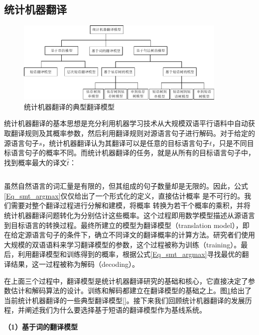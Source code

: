 \subsection{统计机器翻译}

\begin{figure}[!htbp]
	\centering
	\includegraphics[width=0.9\textwidth]{Figure/Figure_2_2.pdf}
	\caption{统计机器翻译的典型翻译模型}
	\label{Fig_smt_model}
\end{figure}

统计机器翻译的基本思想是充分利用机器学习技术从大规模双语平行语料中自动获取翻译规则及其概率参数，然后利用翻译规则对源语言句子进行解码。对于给定的源语言句子$s$，统计机器翻译认为其翻译可以是任意的目标语言句子$t$，只是不同目标语言句子的概率不同。而统计机器翻译的任务，就是从所有的目标语言句子中，找到概率最大的译文$\widehat{t}$：

\begin{equation}
\label{Eq_smt_argmax}
\end{equation}

虽然自然语言的词汇量是有限的，但其组成的句子数量却是无限的。因此，公式\ref{Eq_smt_argmax}仅仅给出了一个形式化的定义，直接估计概率 是不可行的。我们需要对整个翻译过程进行分解和建模，将概率 转换为若干个概率的乘积，并将统计机器翻译问题转化为分别估计这些概率。这个过程即用数学模型描述从源语言到目标语言的转换过程。最终所建立的模型为翻译模型（translation model），即在给定源语言句子的条件下，确立不同译文的翻译概率的计算方法。研究者们使用大规模的双语语料来学习翻译模型的参数，这个过程被称为训练（training）。最后，利用翻译模型和训练得到的概率，根据公式\ref{Eq_smt_argmax}寻找最优的翻译结果，这一过程被称为解码（decoding）。

在上面三个过程中，翻译模型是统计机器翻译研究的基础和核心，它直接决定了参数估计和解码算法的设计。训练和解码都建立在翻译模型的基础之上。图\ref{Fig_smt_model}给出了当前统计机器翻译的一些典型翻译模型[\cite{zhangzong:2013}]。接下来我们回顾统计机器翻译的发展历程，并阐述我们为什么要选择基于短语的翻译模型作为基线系统。

\textbf{（1）基于词的翻译模型}

